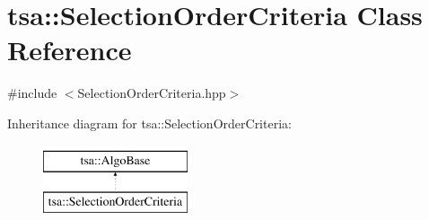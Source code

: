\hypertarget{classtsa_1_1_selection_order_criteria}{}\section{tsa\+:\+:Selection\+Order\+Criteria Class Reference}
\label{classtsa_1_1_selection_order_criteria}


{\ttfamily \#include $<$Selection\+Order\+Criteria.\+hpp$>$}

Inheritance diagram for tsa\+:\+:Selection\+Order\+Criteria\+:\begin{figure}[H]
\begin{center}
\leavevmode
\includegraphics[height=2.000000cm]{classtsa_1_1_selection_order_criteria}
\end{center}
\end{figure}

